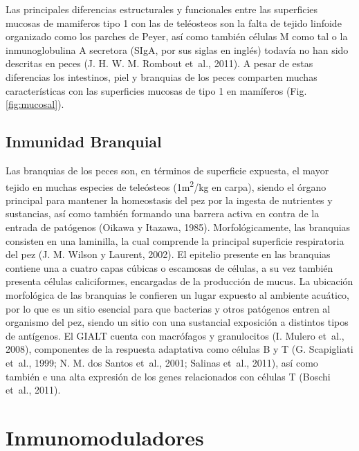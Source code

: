 \documentclass[12pt,letterpaper,oneside]{scrbook}
\begin{document}
Las principales diferencias estructurales y funcionales entre las
superficies mucosas de mamiferos tipo 1 con las de teléosteos son la
falta de tejido linfoide organizado como los parches de Peyer, así como
también células M como tal o la inmunoglobulina A secretora (SIgA, por
sus siglas en inglés) todavía no han sido descritas en peces (J. H. W.
M. Rombout et~al., 2011). A pesar de estas diferencias los intestinos,
piel y branquias de los peces comparten muchas características con las
superficies mucosas de tipo 1 en mamíferos (Fig. \ref{fig:mucosal}).

\subsection{Inmunidad Branquial}

Las branquias de los peces son, en términos de superficie expuesta, el
mayor tejido en muchas especies de teleósteos (1m\textsuperscript{2}/kg
en carpa), siendo el órgano principal para mantener la homeostasis del
pez por la ingesta de nutrientes y sustancias, así como también formando
una barrera activa en contra de la entrada de patógenos (Oikawa y
Itazawa, 1985). Morfológicamente, las branquias consisten en una
laminilla, la cual comprende la principal superficie respiratoria del
pez (J. M. Wilson y Laurent, 2002). El epitelio presente en las
branquias contiene una a cuatro capas cúbicas o escamosas de células, a
su vez también presenta células caliciformes, encargadas de la
producción de mucus. La ubicación morfológica de las branquias le
confieren un lugar expuesto al ambiente acuático, por lo que es un sitio
esencial para que bacterias y otros patógenos entren al organismo del
pez, siendo un sitio con una sustancial exposición a distintos tipos de
antígenos. El GIALT cuenta con macrófagos y granulocitos (I. Mulero
et~al., 2008), componentes de la respuesta adaptativa como células B y T
(G. Scapigliati et~al., 1999; N. M. dos Santos et~al., 2001; Salinas
et~al., 2011), así como también e una alta expresión de los genes
relacionados con células T (Boschi et~al., 2011).

\section{Inmunomoduladores}
\end{document}
